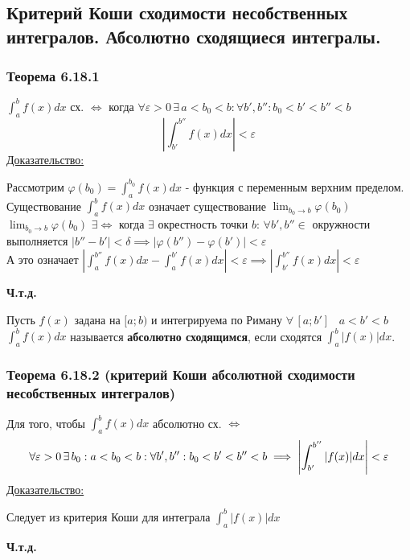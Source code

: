 \documentclass[12pt]{article}
\begin{document}
    \subsection{Критерий Коши сходимости несобственных интегралов. Абсолютно сходящиеся интегралы.}
    \subsubsection*{Теорема 6.18.1}\label{th:6.18.1}
    $\int_{a}^{b}f(x)dx$ сх. $\Longleftrightarrow$ когда $\forall \varepsilon > 0\,\exists\,a<b_0<b:\forall b',b'':b_0<b'<b''<b$
    \[ \left| \int_{b'}^{b''}f(x)dx \right| < \varepsilon \]
    \underline{Доказательство:}
    \begin{adjustwidth}{1.5em}{1.5em}
        Рассмотрим $\varphi(b_0)=\int_{a}^{b_0}f(x)dx$ - функция с переменным верхним пределом.\\
        Существование $\int_{a}^{b}f(x)dx$ означает существование $\lim_{b_0 \to b}\varphi(b_0)$\\
        $\lim_{b_0 \to b}\varphi(b_0)$ $\exists \Longleftrightarrow$ когда $\exists$ окрестность точки $b$: $\forall b',b'' \in $ окружности выполняется $|b''-b'|<\delta \implies |\varphi(b'')-\varphi(b')|<\varepsilon$\\
        А это означает $\left| \int_{a}^{b''}f(x)dx - \int_{a}^{b'}f(x)dx \right| < \varepsilon \implies \left| \int_{b'}^{b''} f(x)dx \right| < \varepsilon$
        \begin{center}
            \textbf{Ч.т.д.}
        \end{center}
    \end{adjustwidth}
    Пусть $f(x)$ задана на $[a;b)$ и интегрируема по Риману $\forall\,[a;b'] \;\;\; a<b'<b$\\
    $\int_{a}^{b}f(x)dx$ называется \textbf{абсолютно сходящимся}, если сходятся $\int_{a}^{b}|f(x)|dx$.
    \subsubsection*{Теорема 6.18.2 (критерий Коши абсолютной сходимости несобственных интегралов)}\label{th:6.18.2}
    Для того, чтобы $\int_{a}^{b}f(x)dx$ абсолютно сх. $\Longleftrightarrow$ 
    \[ \forall \varepsilon >0\,\exists\,b_0:a<b_0<b: \forall b',b'':\\b_0<b'<b''<b \implies \left|\int_{b'}^{b''}|f(x)|dx\right| < \varepsilon \]
    \underline{Доказательство:}
    \begin{adjustwidth}{1.5em}{1.5em}
        Следует из критерия Коши для интеграла $\int_{a}^{b}|f(x)|dx$
        \begin{center}
            \textbf{Ч.т.д.}
        \end{center}
    \end{adjustwidth}
\end{document}
